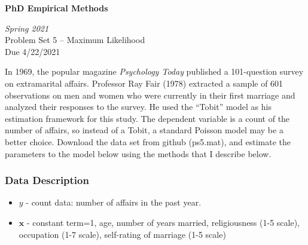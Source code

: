 \documentclass[10pt]{article}
\newcommand{\bs}{\boldsymbol}
\begin{document}
\begin{center}
\textbf{PhD Empirical Methods}

\emph{Spring 2021}\\[1em]

Problem Set 5 -- Maximum Likelihood\\
Due 4/22/2021\\[3em]
\end{center}












In 1969, the popular magazine \emph{Psychology Today} published a 101-question survey on extramarital affairs. Professor Ray Fair (1978) extracted a sample of 601 observations on men and women who were currently in their first marriage and analyzed their responses to the survey. He used the ``Tobit'' model as his estimation framework for this study. The dependent variable is a count of the number of affairs, so instead of a Tobit, a standard Poisson model may be a better choice. Download the data set from github (ps5.mat), and estimate the parameters to the model below using the methods that I describe below. 

\subsubsection*{Data Description} %
 \label{ssub:data_description}

 \begin{itemize}
 	\item $y$ - count data: number of affairs in the past year.
 	\item $\bs{x}$ - constant term=1, age, number of years married, religiousness (1-5 scale), occupation (1-7 scale), self-rating of marriage (1-5 scale)
 \end{itemize}
\end{document}
